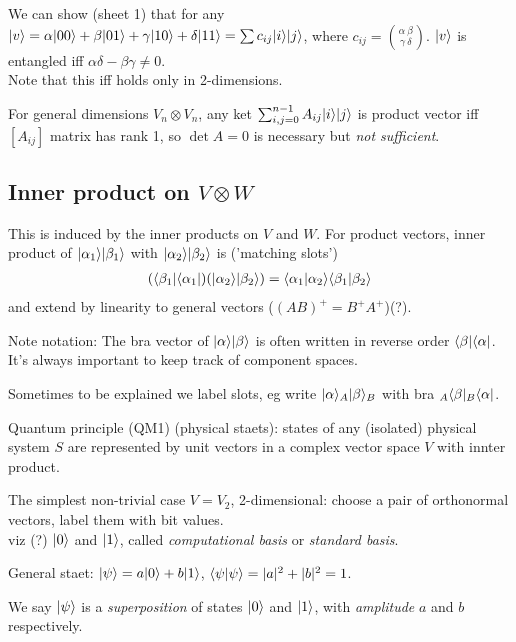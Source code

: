 \documentclass[a4paper]{article}
\begin{document}
We can show (sheet 1) that for any $|v\rangle = \alpha|00\rangle + \beta|01\rangle + \gamma|10 \rangle + \delta|11\rangle = \sum c_{ij} |i\rangle |j \rangle$, where $c_{ij} = {{\alpha\ \beta} \choose {\gamma\ \delta}}$. $|v\rangle$ is entangled iff $\alpha \delta - \beta \gamma \neq 0$. \\
Note that this iff holds only in 2-dimensions.

For general dimensions $V_n \otimes V_n$, any ket $\sum_{i,j=0}^{n-1} A_{ij} |i\rangle |j\rangle$ is product vector iff $[A_{ij}]$ matrix has rank 1, so $\det A = 0$ is necessary but \emph{not sufficient}.

\subsection{Inner product on $V \otimes W$ }
This is induced by the inner products on $V$ and $W$. For product vectors, inner product of $|\alpha_1\rangle |\beta_1 \rangle$ with $|\alpha_2\rangle |\beta_2\rangle$ is ('matching slots') 
\begin{equation*}
\begin{aligned}
(\langle\beta_1|\langle\alpha_1|) (|\alpha_2\rangle |\beta_2 \rangle) = \langle \alpha_1 | \alpha_2 \rangle \langle\beta_1|\beta_2\rangle
\end{aligned}
\end{equation*}
and extend by linearity to general vectors ($(AB)^+ = B^+ A^+$)(?).

Note notation: The bra vector of $|\alpha\rangle |\beta\rangle$ is often written in reverse order $\langle \beta | \langle\alpha|$. It's always important to keep track of component spaces.

Sometimes to be explained we label slots, eg write $|\alpha\rangle_A |\beta\rangle_B$ with bra ${}_A\langle\beta|{}_B\langle\alpha|$.
 
Quantum principle (QM1) (physical staets): states of any (isolated) physical system $S$ are represented by unit vectors in a complex vector space $V$ with innter product.

The simplest non-trivial case $V=V_2$, 2-dimensional: choose a pair of orthonormal vectors, label them with bit values.\\
viz (?) $|0\rangle$ and $|1\rangle$, called \emph{computational basis} or \emph{standard basis}.

General staet: $|\psi\rangle = a|0\rangle + b|1\rangle$, $\langle\psi|\psi\rangle = |a|^2+|b|^2 = 1$.

We say $|\psi\rangle$ is a \emph{superposition} of states $|0\rangle$ and $|1\rangle$, with \emph{amplitude} $a$ and $b$ respectively.
\end{document}
